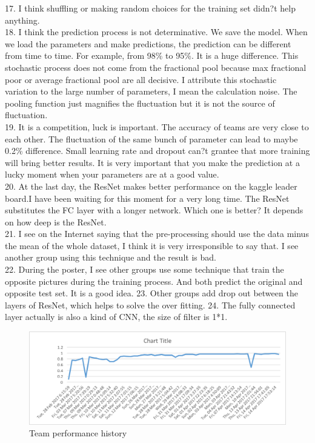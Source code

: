 \documentclass[twocolumn]{webofc}
\begin{document}
17. I think shuffling or making random choices for the training set didn?t help anything.\\
18. I think the prediction process is not determinative. We save the model. When we load the parameters and make predictions, the prediction can be different from time to time. For example, from 98\% to 95\%. It is a huge difference. This stochastic process does not come from the fractional pool because max fractional poor or average fractional pool are all decisive. I attribute this stochastic variation to the large number of parameters, I mean the calculation noise. The pooling function just magnifies the fluctuation but it is not the source of fluctuation. \\
19. It is a competition, luck is important. The accuracy of teams are very close to each other. The fluctuation of the same bunch of parameter can lead to maybe 0.2\% difference. Small learning rate and dropout can?t grantee that more training will bring better results. It is very important that you make the prediction at a lucky moment when your parameters are at a good value. \\
20. At the last day, the ResNet makes better performance on the kaggle leader board.I have been waiting for this moment for a very long time. The ResNet substitutes the FC layer with a longer network. Which one is better? It depends on how deep is the ResNet. \\
21. I see on the Internet saying that the pre-processing should use the data minus the mean of the whole dataset, I think it is very irresponsible to say that. I see another group using this technique and the result is bad. \\
22. During the poster, I see other groups use some technique that train the opposite pictures during the training process. And both predict the original and opposite test set. It is a good idea. 
23. Other groups add drop out between the layers of ResNet, which helps to solve the over fitting.
24. The fully connected layer actually is also a kind of CNN, the size of filter is 1*1. \\
\begin{figure}[H]
  \centering
  \includegraphics[width=\columnwidth]{performance.png}
  \caption{Team performance history}
\end{figure}
\end{document}
